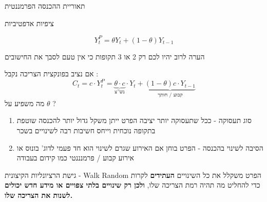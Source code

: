 \documentclass[usenames,dvipsnames]{beamer}
\begin{document}
\begin{RTL}
\begin{frame}[allowframebreaks]{תאוריית ההכנסה הפרמננטית}
\begin{block}{ציפיות אדפטיביות}
    \end{block}
    \[
            Y^P_t = \theta Y_t  +  (1-\theta)Y_{t-1}
            \]
           
                \begin{alertblock}{הערה}
                    לרוב יהיו לכם רק 2 או 3 תקופות כי אין טעם לסבך את החישובים
                \end{alertblock}
    אם נציב בפונקצית הצריכה נקבל : 
    \begin{equation*}
        C_t = c\cdot Y^P_t = \underbrace{\theta\cdot c}_{\text{נש''צ}}\cdot Y_t  + \underbrace{ (1-\theta)c\cdot Y_{t-1}}_{\text{קבוע / חותך}}
    \end{equation*}
    \framebreak
    מה משפיע על $\theta$ ?
    \begin{enumerate}
        \item סוג תעסוקה - ככל שתעסוקה יותר יציבה הפרט ייתן משקל גדול יותר להכנסה שוטפת בתקופה נוכחית וייחס חשיבות רבה לשינויים בשכר
        \item הסיבה לשינוי בהכנסה - הפרט בוחן אם האירוע שגרם לשינוי הוא חד פעמי לדוג' בונוס או אירוע קבוע / פרמנננטי כמו קידום בעבודה
    \end{enumerate}

    \framebreak
    \begin{block}{גישת הרציונליות הקיצונית - Walk Random}
        הפרט משקלל את כל השינויים \textbf{העתידים} לקרות כדי להחליט מה תהיה רמת הצריכה שלו, \textbf{ולכן רק שינויים בלתי צפויים או מידע חדש יכולים לשנות את הצריכה שלו.}


        
    \end{block}
\end{frame}


\end{RTL}
\end{document}

